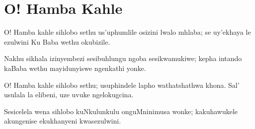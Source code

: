 \starttocol
\chapter{O! Hamba Kahle}
\nexttocol
\hfill{\it }
\stoptocol
\starttocol
\startlines
{\sc O! Hamba} kahle sihlobo sethu
us'uphumlile osizini lwalo mhlaba;
se uy'ekhaya le ezulwini
Ku Baba wethu okubizile.

Nakhu sikhala izinyembezi
sesibuhlungu ngoba sesikwamukiwe;
kepha intando kaBaba wethu
mayidunyiswe ngenkathi yonke.

O! Hamba kahle sihlobo sethu;
usuphindele lapho wathatshathwa khona.
Sal' usulala la elibeni,
uze uvuke ngelokugcina.

Sesicelela wena sihlobo kuNkulunkulu
onguMninimusa wonke;
kakuhawukele akungenise
ekukhanyeni kwasezulwini.
\stoplines
\nexttocol

\stoptocol
